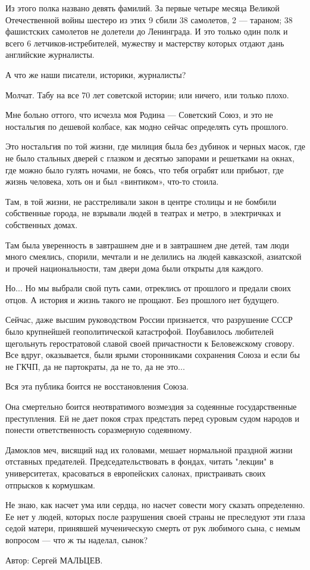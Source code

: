 Из этого полка названо девять фамилий. За первые четыре месяца Великой
Отечественной войны шестеро из этих 9 сбили 38 самолетов, 2 --- тараном; 38
фашистских самолетов не долетели до Ленинграда. И это только один полк и всего
6 летчиков-истребителей, мужеству и мастерству которых отдают дань английские
журналисты.

А что же наши писатели, историки, журналисты?

Молчат. Табу на все 70 лет советской истории; или ничего, или только плохо.

Мне больно оттого, что исчезла моя Родина --- Советский Союз, и это не ностальгия
по дешевой колбасе, как модно сейчас определять суть прошлого.

Это ностальгия по той жизни, где милиция была без дубинок и черных масок, где
не было стальных дверей с глазком и десятью запорами и решетками на окнах, где
можно было гулять ночами, не боясь, что тебя ограбят или прибьют, где жизнь
человека, хоть он и был «винтиком», что-то стоила.

Там, в той жизни, не расстреливали закон в центре столицы и не бомбили
собственные города, не взрывали людей в театрах и метро, в электричках и
собственных домах.

Там была уверенность в завтрашнем дне и в завтрашнем дне детей, там люди много
смеялись, спорили, мечтали и не делились на людей кавказской, азиатской и
прочей национальности, там двери дома были открыты для каждого.

Но... Но мы выбрали свой путь сами, отреклись от прошлого и предали своих
отцов. А история и жизнь такого не прощают. Без прошлого нет будущего.

Сейчас, даже высшим руководством России признается, что разрушение СССР было
крупнейшей геополитической катастрофой. Поубавилось любителей щегольнуть
геростратовой славой своей причастности к Беловежскому сговору. Все вдруг,
оказывается, были ярыми сторонниками сохранения Союза и если бы не ГКЧП, да не
партократы, да не то, да не это...

Вся эта публика боится не восстановления Союза.

Она смертельно боится неотвратимого возмездия за содеянные государственные
преступления. Ей не дает покоя страх предстать перед суровым судом народов и
понести ответственность соразмерную содеянному.

Дамоклов меч, висящий над их головами, мешает нормальной праздной жизни
отставных предателей. Председательствовать в фондах, читать "лекции" в
университетах, красоваться в европейских салонах, пристраивать своих отпрысков
к кормушкам.

Не знаю, как насчет ума или сердца, но насчет совести могу сказать определенно.
Ее нет у людей, которых после разрушения своей страны не преследуют эти глаза
седой матери, принявшей мученическую смерть от рук любимого сына, с немым
вопросом --- что ж ты наделал, сынок?

Автор: Сергей МАЛЬЦЕВ.


